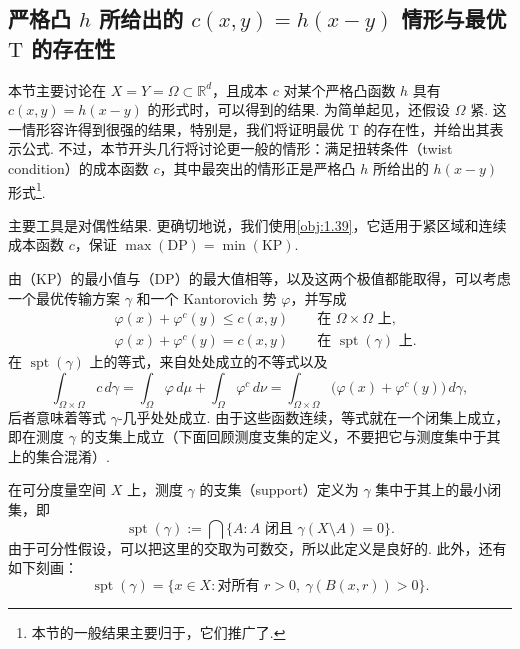 \subsection[严格凸成本与最优传输映射的存在性]{严格凸 $h$ 所给出的 $c(x,y)=h(x-y)$ 情形与最优 $\mathrm{T}$ 的存在性}\label{sec:1.3}

本节主要讨论在 $X=Y=\Omega\subset\mathbb R^d$，且成本 $c$ 对某个严格凸函数 $h$ 具有 $c(x,y)=h(x-y)$ 的形式时，可以得到的结果. 为简单起见，还假设 $\Omega$ 紧. 这一情形容许得到很强的结果，特别是，我们将证明最优 $\mathrm{T}$ 的存在性，并给出其表示公式. 不过，本节开头几行将讨论更一般的情形：满足扭转条件（twist condition）的成本函数 $c$，其中最突出的情形正是严格凸 $h$ 所给出的 $h(x-y)$ 形式\footnote{本节的一般结果主要归于\cite{b176}，它们推广了\cite{b82,b84}.}.

主要工具是对偶性结果. 更确切地说，我们使用\autoref{obj:1.39}，它适用于紧区域和连续成本函数 $c$，保证 $\max(\mathrm{DP})=\min(\mathrm{KP})$.

由（KP）的最小值与（DP）的最大值相等，以及这两个极值都能取得，可以考虑一个最优传输方案 $\gamma$ 和一个 Kantorovich 势 $\varphi$，并写成
\begin{equation*}
\begin{aligned}
&\varphi(x)+\varphi^c(y)\le c(x,y)\qquad\text{在 }\Omega\times\Omega\text{ 上},\\
&\varphi(x)+\varphi^c(y)=c(x,y)\qquad\text{在 }\operatorname{spt}(\gamma)\text{ 上}.
\end{aligned}
\end{equation*}
在 $\operatorname{spt}(\gamma)$ 上的等式，来自处处成立的不等式以及
\[
\int_{\Omega\times\Omega}c\,d\gamma
=\int_\Omega\varphi\,d\mu+\int_\Omega\varphi^c\,d\nu
=\int_{\Omega\times\Omega}\bigl(\varphi(x)+\varphi^c(y)\bigr)\,d\gamma,
\]
后者意味着等式 $\gamma$-几乎处处成立. 由于这些函数连续，等式就在一个闭集上成立，即在测度 $\gamma$ 的支集上成立（下面回顾测度支集的定义，不要把它与测度集中于其上的集合混淆）.

\begin{definition}\label{obj:1.14}
在可分度量空间 $X$ 上，测度 $\gamma$ 的支集（support）定义为 $\gamma$ 集中于其上的最小闭集，即
\[
\operatorname{spt}(\gamma):=\bigcap\{A:A\text{ 闭且 }\gamma(X\setminus A)=0\}.
\]
由于可分性假设，可以把这里的交取为可数交，所以此定义是良好的. 此外，还有如下刻画：
\[
\operatorname{spt}(\gamma)=\{x\in X:\text{对所有 }r>0,\ \gamma(B(x,r))>0\}.
\]
\end{definition}

